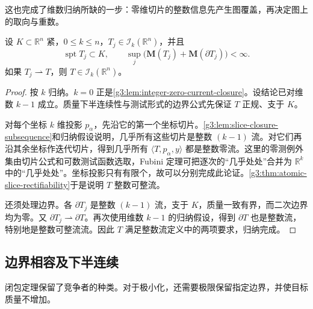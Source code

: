 这也完成了维数归纳所缺的一步：零维切片的整数信息先产生图覆盖，再决定图上的取向与重数。

\begin{theorem}\label{g3:thm:integer-current-closure}
	设 \(K\subset\mathbb R^n\) 紧，\(0\le k\le n\)，\(T_j\in\mathcal I_k(\mathbb R^n)\)，并且
	\[
		\operatorname{spt}T_j\subset K,\qquad
		\sup_j\bigl(\mathbf M(T_j)+\mathbf M(\partial T_j)\bigr)<\infty.
	\]
	如果 \(T_j\rightharpoonup T\)，则 \(T\in\mathcal I_k(\mathbb R^n)\)。
\end{theorem}
\begin{proof}
	按 \(k\) 归纳。\(k=0\) 正是\cref{g3:lem:integer-zero-current-closure}。设结论已对维数 \(k-1\) 成立。质量下半连续性与测试形式的边界公式先保证 \(T\) 正规、支于 \(K\)。

	对每个坐标 \(k\) 维投影 \(p_\alpha\)，先沿它的第一个坐标切片。\cref{g3:lem:slice-closure-subsequence}和归纳假设说明，几乎所有这些切片是整数 \((k-1)\) 流。对它们再沿其余坐标作迭代切片，得到几乎所有 \(\langle T,p_\alpha,y\rangle\) 都是整数零流。这里的零测例外集由切片公式和可数测试函数选取，Fubini 定理可把逐次的“几乎处处”合并为 \(\mathbb R^k\) 中的“几乎处处”。坐标投影只有有限个，故可以分别完成此论证。\cref{g3:thm:atomic-slice-rectifiability}于是说明 \(T\) 整数可整流。

	还须处理边界。各 \(\partial T_j\) 是整数 \((k-1)\) 流，支于 \(K\)，质量一致有界，而二次边界均为零。又
	\(\partial T_j\rightharpoonup\partial T\)。再次使用维数 \(k-1\) 的归纳假设，得到 \(\partial T\) 也是整数流，特别地是整数可整流流。因此 \(T\) 满足整数流定义中的两项要求，归纳完成。
\end{proof}

\subsection{边界相容及下半连续}
\label{g3:subsec:2205:06}
闭包定理保留了竞争者的种类。对于极小化，还需要极限保留指定边界，并使目标质量不增加。

